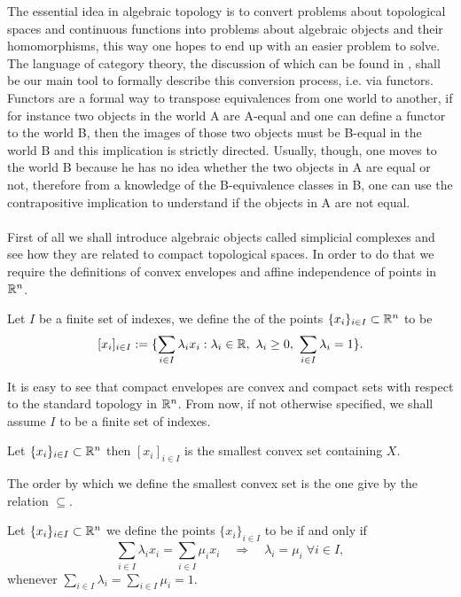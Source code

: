 \documentclass[../1.tex]{subfiles}
\begin{document}
    The essential idea in algebraic topology is to convert problems about topological spaces and continuous functions into
    problems about algebraic objects and their homomorphisms, this way one hopes to end up with an easier problem to solve. 
    The language of category theory, the discussion of which can be found in \cite{rotman}, shall be our main tool to formally
    describe this conversion process, i.e. via functors. Functors are a formal way to transpose equivalences from one world to another, 
    if for instance two objects in the world A are A-equal and one can define a functor to the world B, then the images of those two objects 
    must be B-equal in the world B and this implication is strictly directed. Usually, though, one moves to the world B because he has no idea
    whether the two objects in A are equal or not, therefore from a knowledge of the B-equivalence classes in B, one can use the contrapositive implication 
    to understand if the objects in A are not equal.\\
    \hfill \\
    First of all we shall introduce algebraic objects called simplicial complexes and see how they are related to compact
    topological spaces. In order to do that we require the definitions of convex envelopes and affine independence of points in $\mathbb{R}^n$.

    \begin{defn}
        Let $I$ be a finite set of indexes, we define the  of the points $\{x_i\}_{i \in I} \subset \mathbb{R}^n$ to be 
        \[ [ x_i ]_{i \in I} := \{ \sum_{i \in I} \lambda_i x_i : \lambda_i \in \mathbb{R},\ \lambda_i \geq 0,\  \sum_{i \in I} \lambda_i = 1 \}.\]
    \end{defn}

    It is easy to see that compact envelopes are convex and compact sets with respect to the standard topology in $\mathbb{R}^n$.
    From now, if not otherwise specified, we shall assume $I$ to be a finite set of indexes.

    \begin{prop}
        Let $\{x_i\}_{i \in I} \subset \mathbb{R}^n$ then $[ x_i ]_{i \in I}$ is the smallest convex set containing $X$.
    \end{prop}

    The order by which we define the smallest convex set is the one give by the relation $\subseteq$.

    \begin{defn}
        Let $\{x_i\}_{i \in I} \subset \mathbb{R}^n$ we define the points $\{x_i\}_{i \in I}$ to be  if and only if
        \[ \sum_{i \in I} \lambda_i x_i = \sum_{i \in I} \mu_i x_i \quad \Rightarrow \quad 
        \lambda_i = \mu_i \; \forall i \in I ,\]
        whenever $\sum_{i \in I} \lambda_i = \sum_{i \in I} \mu_i = 1$.
    \end{defn}
\end{document}
